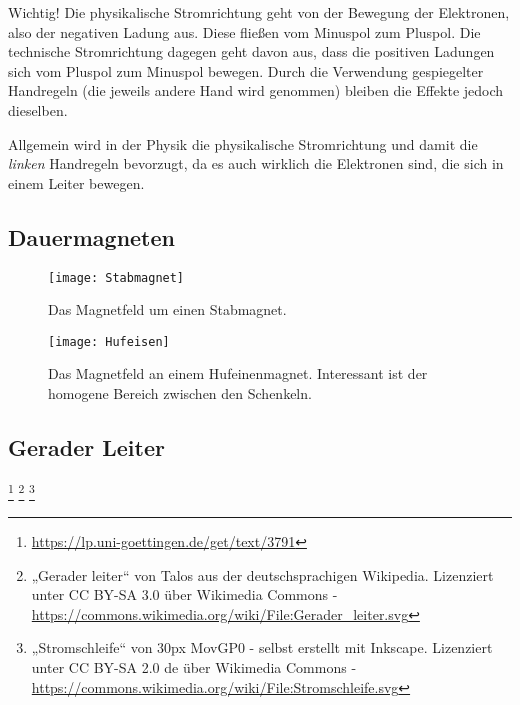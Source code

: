 \begin{leftbar}
	Wichtig! Die physikalische Stromrichtung geht von der Bewegung der Elektronen, also der negativen Ladung aus. Diese fließen vom Minuspol zum Pluspol. Die technische Stromrichtung dagegen geht davon aus, dass die positiven Ladungen sich vom Pluspol zum Minuspol bewegen. Durch die Verwendung gespiegelter Handregeln (die jeweils andere Hand wird genommen) bleiben die Effekte jedoch dieselben. 
	
	Allgemein wird in der Physik die physikalische Stromrichtung und damit die \emph{linken} Handregeln bevorzugt, da es auch wirklich die Elektronen sind, die sich in einem Leiter bewegen.
\end{leftbar}

\subsection{Dauermagneten}  	\label{subsec:DauermagnetFeld}

\hfill

\begin{figure}[ht!]
	\centering
	\begin{minipage}[b]{0.4\linewidth}
    	\texttt{[image: Stabmagnet]}
		\caption{Das Magnetfeld um einen Stabmagnet.}
	\end{minipage}
	\quad
	\begin{minipage}[b]{0.4\linewidth}
    	\texttt{[image: Hufeisen]}
		\caption{Das Magnetfeld an einem Hufeinenmagnet. Interessant ist der homogene Bereich zwischen den Schenkeln.}
	\end{minipage}
\end{figure}


\subsection{Gerader Leiter} 
\footnote{\url{https://lp.uni-goettingen.de/get/text/3791}} 
\footnote{„Gerader leiter“ von Talos aus der deutschsprachigen Wikipedia. Lizenziert unter CC BY-SA 3.0 über Wikimedia Commons - \url{https://commons.wikimedia.org/wiki/File:Gerader_leiter.svg}} 
\footnote{„Stromschleife“ von 30px MovGP0 - selbst erstellt mit Inkscape. Lizenziert unter CC BY-SA 2.0 de über Wikimedia Commons - \url{https://commons.wikimedia.org/wiki/File:Stromschleife.svg}} 
\label{subsec:GeraderLeiterFeld}

\hfill

